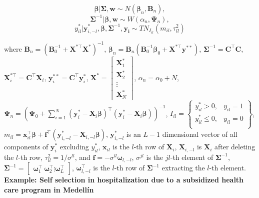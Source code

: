 \begin{equation*}
	\bm{\beta}|\bm{\Sigma},\bm{w}\sim{N}(\bm{\beta}_n,\bm{B}_n),
\end{equation*}
\begin{equation*}
	\bm{\Sigma}^{-1}|\bm{\beta},\bm{w}\sim{W}(\alpha_n,\bm{\Psi}_n),
\end{equation*}
\begin{equation*}
	y_{il}^*|\bm{y}_{i,-l}^*,\bm{\beta},\bm{\Sigma}^{-1},\bm{y_i}\sim{T}{N}_{I_{il}}(m_{il},\tau_{ll}^2)
\end{equation*}

where $\bm{B}_n=(\bm{B}_0^{-1}+\bm{X}^{*\top}\bm{X}^*)^{-1}$, $\bm{\beta}_n=\bm{B}_n(\bm{B}_0^{-1}\bm{\beta}_0+\bm{X}^{*\top}\bm{y}^{**})$, $\bm{\Sigma}^{-1}=\bm{C}^{\top}\bm{C}$, $\bm{X}_i^{*\top}=\bm{C}^{\top}\bm{X}_i$, $\bm{y}_i^{**}=\bm{C}^{\top}\bm{y}_i^*$, $\bm{X}^*=\begin{bmatrix}\bm{X}_1^*\\
	\bm{X}_2^*\\
	\vdots\\
	\bm{X}_N^*
\end{bmatrix}$, $\alpha_n=\alpha_0+N$, $\bm{\Psi}_n=(\bm{\Psi}_0+\sum_{i=1}^N (\bm{y}_i^*-\bm{X}_i\bm{\beta})^{\top}(\bm{y}_i^*-\bm{X}_i\bm{\beta}))^{-1}$, $I_{il}=\begin{Bmatrix} y_{il}^*> 0, & y_{il}=1\\
	y_{il}^*\leq 0 , & y_{il}=0\\
\end{Bmatrix}$, $m_{il}=\bm{x}_{il}^{\top}\bm{\beta}+\bm{f}^{\top}(\bm{y}_{i,-l}^*-\bm{X}_{i,-l}\bm{\beta})$, $\bm{y}_{i,-l}^*$ is an $L-1$ dimensional vector of all components of $\bm{y}_i^*$ excluding $y_{il}^*$, $\bm{x}_{il}$ is the $l$-th row of $\bm{X}_i$, $\bm{X}_{i,-l}$ is $\bm{X}_{i}$ after deleting the $l$-th row, $\tau_{ll}^2=1/\sigma^{ll}$, and $\bm{f}=-\sigma^{ll}\bm{\omega}_{l,-l}$, $\sigma^{jl}$ is the $jl$-th element of $\bm{\Sigma}^{-1}$, $\bm{\Sigma}^{-1}=\begin{bmatrix}\bm{\omega}_1^{\top} \ \bm{\omega}_2^{\top} \vdots \bm{\omega}_{L}^{\top} \end{bmatrix}$, $\bm{\omega}_{l,-l}^{\top}$ is the $l$-th row of $\bm{\Sigma}^{-1}$ extracting the $l$-th element.\\


\textbf{Example: Self selection in hospitalization due to a subsidized health care program in Medell\'in}

